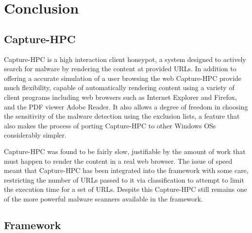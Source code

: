 \section{Conclusion} 
 


\subsection{Capture-HPC}




Capture-HPC is a high interaction client honeypot, a system designed to actively
search for malware by rendering the content at provided URLs. In addition to
offering a accurate simulation of a user browsing the web Capture-HPC provide
much flexibility, capable of automatically rendering content using a variety of
client programs including web browsers such as Internet Explorer and Firefox,
and the PDF viewer Adobe Reader. It also allows a degree of freedom in choosing
the sensitivity of the malware detection using the exclusion lists, a feature
that also makes the process of porting Capture-HPC to other Windows OSs
considerably simpler.

Capture-HPC was found to be fairly slow, justifiable by the amount of work that
must happen to render the content in a real web browser. The issue of speed
meant that Capture-HPC has been integrated into the framework with some care,
restricting the number of URLs passed to it via classification to attempt to
limit the execution time for a set of URLs. Despite this Capture-HPC still 
remains one of the more powerful malware scanners available in the framework.


\subsection{Framework}
